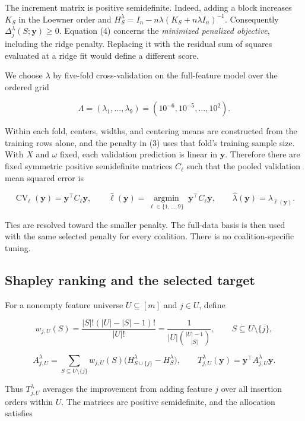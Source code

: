 \documentclass[
  11pt,
]{article}
\begin{document}
The increment matrix is positive semidefinite. Indeed, adding a block
increases \(K_S\) in the Loewner order and
\(H_S^\lambda=I_n-n\lambda(K_S+n\lambda I_n)^{-1}\). Consequently
\(\Delta_j^\lambda(S;\boldsymbol y)\ge0\). Equation (4) concerns the
\emph{minimized penalized objective}, including the ridge penalty.
Replacing it with the residual sum of squares evaluated at a ridge fit
would define a different score.

We choose \(\lambda\) by five-fold cross-validation on the full-feature
model over the ordered grid

\[
\Lambda=(\lambda_1,\ldots,\lambda_9)=(10^{-6},10^{-5},\ldots,10^2).
\]

Within each fold, centers, widths, and centering means are constructed
from the training rows alone, and the penalty in (3) uses that fold's
training sample size. With \(X\) and \(\omega\) fixed, each validation
prediction is linear in \(\boldsymbol y\). Therefore there are fixed
symmetric positive semidefinite matrices \(C_\ell\) such that the pooled
validation mean squared error is

\[
\operatorname{CV}_\ell(\boldsymbol y)=\boldsymbol y^\top C_\ell \boldsymbol y,\qquad
\widehat\ell(\boldsymbol y)=\underset{\ell\in\{1,\ldots,9\}}{\operatorname{argmin}}\;\boldsymbol y^\top C_\ell \boldsymbol y,
\qquad \widehat\lambda(\boldsymbol y)=\lambda_{\widehat\ell(\boldsymbol y)}.
\tag{5}
\]

Ties are resolved toward the smaller penalty. The full-data basis is
then used with the same selected penalty for every coalition. There is
no coalition-specific tuning.

\subsection{Shapley ranking and the selected
target}\label{shapley-ranking-and-the-selected-target}

For a nonempty feature universe \(U\subseteq[m]\) and \(j\in U\), define

\[
w_{j,U}(S)=\frac{|S|!(|U|-|S|-1)!}{|U|!}
=\frac{1}{|U|\binom{|U|-1}{|S|}},
\qquad S\subseteq U\setminus\{j\},
\]

\[
A_{j,U}^\lambda
=\sum_{S\subseteq U\setminus\{j\}}w_{j,U}(S)
\bigl(H_{S\cup\{j\}}^\lambda-H_S^\lambda\bigr),
\qquad
T_{j,U}^\lambda(\boldsymbol y)=\boldsymbol y^\top A_{j,U}^\lambda \boldsymbol y.
\tag{6}
\]


Thus \(T_{j,U}^\lambda\) averages the improvement from adding feature
\(j\) over all insertion orders within \(U\). The matrices are positive
semidefinite, and the allocation satisfies
\end{document}
